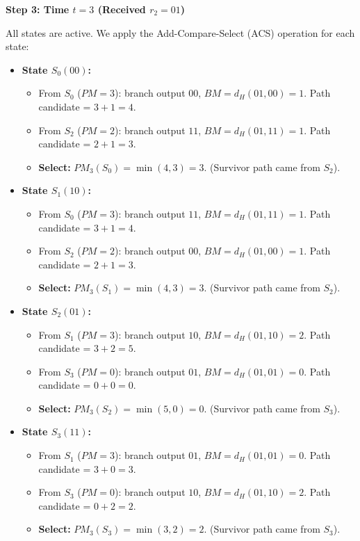 \documentclass[12pt,a4paper]{article}
\begin{document}
\textbf{Step 3: Time $t=3$ (Received $r_2 = 01$)}\par\noindent
All states are active. We apply the Add-Compare-Select (ACS) operation for each state:
\begin{itemize}[leftmargin=*, itemsep=3.5pt]
  \item \textbf{State $S_0(00)$:}
    \begin{itemize}[leftmargin=*, itemsep=1pt]
      \item From $S_0$ ($PM=3$): branch output $00$, $BM = d_H(01, 00) = 1$. Path candidate = $3 + 1 = 4$.
      \item From $S_2$ ($PM=2$): branch output $11$, $BM = d_H(01, 11) = 1$. Path candidate = $2 + 1 = 3$.
      \item \textbf{Select:} $PM_3(S_0) = \min(4, 3) = 3$. (Survivor path came from $S_2$).
    \end{itemize}
  \item \textbf{State $S_1(10)$:}
    \begin{itemize}[leftmargin=*, itemsep=1pt]
      \item From $S_0$ ($PM=3$): branch output $11$, $BM = d_H(01, 11) = 1$. Path candidate = $3 + 1 = 4$.
      \item From $S_2$ ($PM=2$): branch output $00$, $BM = d_H(01, 00) = 1$. Path candidate = $2 + 1 = 3$.
      \item \textbf{Select:} $PM_3(S_1) = \min(4, 3) = 3$. (Survivor path came from $S_2$).
    \end{itemize}
  \item \textbf{State $S_2(01)$:}
    \begin{itemize}[leftmargin=*, itemsep=1pt]
      \item From $S_1$ ($PM=3$): branch output $10$, $BM = d_H(01, 10) = 2$. Path candidate = $3 + 2 = 5$.
      \item From $S_3$ ($PM=0$): branch output $01$, $BM = d_H(01, 01) = 0$. Path candidate = $0 + 0 = 0$.
      \item \textbf{Select:} $PM_3(S_2) = \min(5, 0) = 0$. (Survivor path came from $S_3$).
    \end{itemize}
  \item \textbf{State $S_3(11)$:}
    \begin{itemize}[leftmargin=*, itemsep=1pt]
      \item From $S_1$ ($PM=3$): branch output $01$, $BM = d_H(01, 01) = 0$. Path candidate = $3 + 0 = 3$.
      \item From $S_3$ ($PM=0$): branch output $10$, $BM = d_H(01, 10) = 2$. Path candidate = $0 + 2 = 2$.
      \item \textbf{Select:} $PM_3(S_3) = \min(3, 2) = 2$. (Survivor path came from $S_3$).
    \end{itemize}
\end{itemize}
\end{document}
